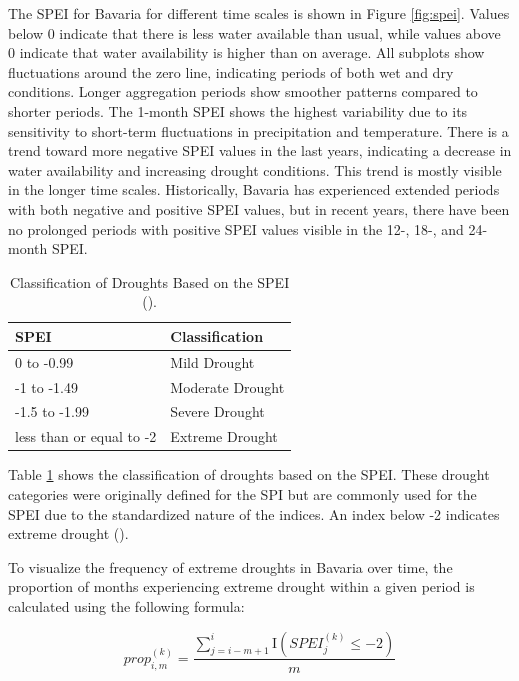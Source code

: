 \documentclass[
]{krantz}
\begin{document}
The SPEI for Bavaria for different time scales is shown in Figure \ref{fig:spei}.
Values below 0 indicate that there is less water available than usual, while values above 0 indicate that water availability is higher than on average.
All subplots show fluctuations around the zero line, indicating periods of both wet and dry conditions. Longer aggregation periods show smoother patterns compared to shorter periods.
The 1-month SPEI shows the highest variability due to its sensitivity to short-term fluctuations in precipitation and temperature.
There is a trend toward more negative SPEI values in the last years, indicating a decrease in water availability and increasing drought conditions. This trend is mostly visible in the longer time scales.
Historically, Bavaria has experienced extended periods with both negative and positive SPEI values, but in recent years, there have been no prolonged periods with positive SPEI values visible in the 12-, 18-, and 24-month SPEI.



\begin{table}

\caption{\label{tab:speiClassification}Classification of Droughts Based on the SPEI (\citet{mckee1993}).}
\centering
\begin{tabular}[t]{ll}
\toprule
SPEI & Classification\\
\midrule
0 to -0.99 & Mild Drought\\
-1 to -1.49 & Moderate Drought\\
-1.5 to -1.99 & Severe Drought\\
less than or equal to -2 & Extreme Drought\\
\bottomrule
\end{tabular}
\end{table}

Table \ref{tab:speiClassification} shows the classification of droughts based on the SPEI. These drought categories were originally defined for the SPI but are commonly used for the SPEI due to the standardized nature of the indices.
An index below -2 indicates extreme drought (\citet{mckee1993}).

To visualize the frequency of extreme droughts in Bavaria over time, the proportion of months experiencing extreme drought within a given period is calculated using the following formula:

\begin{equation}
prop_{i,m}^{(k)} = \frac{\sum_{j=i-m+1}^{i} \text{I}(SPEI_{j}^{(k)} \leq -2)}{m}
\end{equation}
\end{document}
